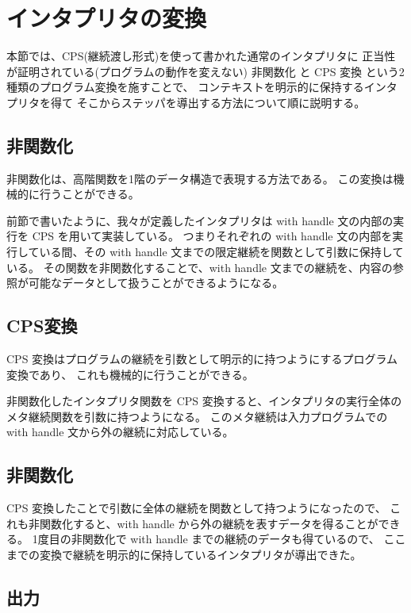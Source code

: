 \section{インタプリタの変換}
\label{section:transform}

本節では、CPS(継続渡し形式)を使って書かれた通常のインタプリタに
正当性が証明されている(プログラムの動作を変えない)
非関数化 \cite{Reynolds1998} と CPS 変換 \cite{PLOTKIN1975125} という2種類のプログラム変換を施すことで、
コンテキストを明示的に保持するインタプリタを得て
そこからステッパを導出する方法について順に説明する。

\subsection{非関数化}
\label{subsection:defun}

非関数化は、高階関数を1階のデータ構造で表現する方法である。
この変換は機械的に行うことができる。

前節で書いたように、我々が定義したインタプリタは with handle 文の内部の実行を CPS を用いて実装している。
つまりそれぞれの with handle 文の内部を実行している間、その with handle 文までの限定継続を関数として引数に保持している。
その関数を非関数化することで、with handle 文までの継続を、内容の参照が可能なデータとして扱うことができるようになる。

\subsection{CPS変換}
\label{subsection:cps}

CPS 変換はプログラムの継続を引数として明示的に持つようにするプログラム変換であり、
これも機械的に行うことができる。

非関数化したインタプリタ関数を CPS 変換すると、インタプリタの実行全体のメタ継続関数を引数に持つようになる。
このメタ継続は入力プログラムでの with handle 文から外の継続に対応している。

\subsection{非関数化}
\label{subsection:defun2}

CPS 変換したことで引数に全体の継続を関数として持つようになったので、
これも非関数化すると、with handle から外の継続を表すデータを得ることができる。
1度目の非関数化で with handle までの継続のデータも得ているので、
ここまでの変換で継続を明示的に保持しているインタプリタが導出できた。

\subsection{出力}
\label{subsection:output}

